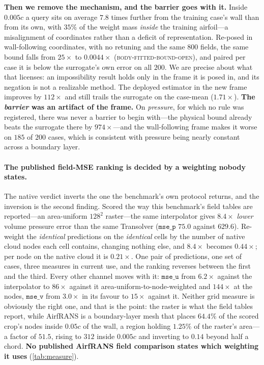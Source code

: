\textbf{Then we remove the mechanism, and the barrier goes with it.} Inside $0.005c$ a
query sits on average $7.8$ times further from the training case's wall than from its own,
with $35\%$ of the weight mass \emph{inside} the training airfoil---a misalignment of
coordinates rather than a deficit of representation. Re-posed in wall-following
coordinates, with no retuning and the same $800$ fields, the same bound falls from
$25\times$ to $\mathbf{0.0044\times}$ (\textsc{body-fitted-bound-open}), and paired per
case it is below the surrogate's own error on all $200$. We are precise about what that
licenses: an impossibility result holds only in the frame it is posed in, and its negation
is not a realizable method. The deployed estimator in the new frame improves by $112\times$
and still trails the surrogate on the case-mean ($1.71\times$). \textbf{The \emph{barrier}
was an artifact of the frame.} On \emph{pressure}, for which no rule was registered, there
was never a barrier to begin with---the physical bound already beats the surrogate there by
$974\times$---and the wall-following frame makes it worse on $185$ of $200$ cases, which is
consistent with pressure being nearly constant across a boundary layer.

\paragraph{The published field-MSE ranking is decided by a weighting nobody states.} The
native verdict inverts the one the benchmark's own protocol returns, and the inversion is the
second finding. Scored the way this benchmark's field tables are reported---an
area-uniform $128^2$ raster---the same interpolator gives $8.4\times$ \emph{lower} volume
pressure error than the same Transolver ($\texttt{mse\_p}$ $75.0$ against $629.6$).
Re-weight the \emph{identical} predictions on the \emph{identical} cells by the number of
native cloud nodes each cell contains, changing nothing else, and $8.4\times$ becomes
$\mathbf{0.44\times}$; per node on the native cloud it is $0.21\times$. One pair of
predictions, one set of cases, three measures in current use, and the ranking reverses between
the first and the third. Every other channel moves with it: $\texttt{mse\_u}$ from
$6.2\times$ against the interpolator to $86\times$ against it area-uniform-to-node-weighted
and $144\times$ at the nodes, $\texttt{mse\_v}$ from $3.0\times$ in its favour to
$15\times$ against it. Neither grid measure is obviously
the right one, and that is the point: the raster is what the field tables report, while
AirfRANS is a boundary-layer mesh that places $64.4\%$ of the scored crop's nodes inside $0.05c$
of the wall, a region holding $1.25\%$ of the raster's area---a factor of $51.5$, rising to
$312$ inside $0.005c$ and inverting to $0.14$ beyond half a chord. \textbf{No published
AirfRANS field comparison states which weighting it uses} (\autoref{tab:measure}).

